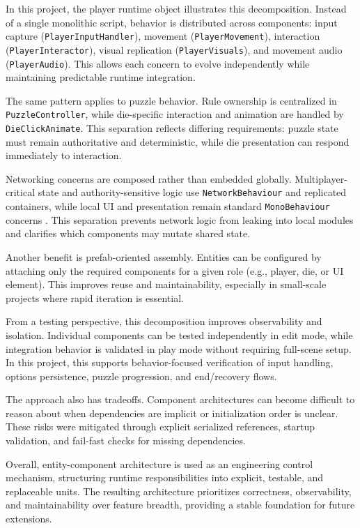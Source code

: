 In this project, the player runtime object illustrates this decomposition. Instead of a single monolithic script, behavior is distributed across components: input capture (\texttt{PlayerInputHandler}), movement (\texttt{PlayerMovement}), interaction (\texttt{PlayerInteractor}), visual replication (\texttt{PlayerVisuals}), and movement audio (\texttt{PlayerAudio}). This allows each concern to evolve independently while maintaining predictable runtime integration.

The same pattern applies to puzzle behavior. Rule ownership is centralized in \texttt{PuzzleController}, while die-specific interaction and animation are handled by \texttt{DieClickAnimate}. This separation reflects differing requirements: puzzle state must remain authoritative and deterministic, while die presentation can respond immediately to interaction.

Networking concerns are composed rather than embedded globally. Multiplayer-critical state and authority-sensitive logic use \texttt{NetworkBehaviour} and replicated containers, while local UI and presentation remain standard \texttt{MonoBehaviour} concerns \cite{unity_monobehaviour_docs}. This separation prevents network logic from leaking into local modules and clarifies which components may mutate shared state.

Another benefit is prefab-oriented assembly. Entities can be configured by attaching only the required components for a given role (e.g., player, die, or UI element). This improves reuse and maintainability, especially in small-scale projects where rapid iteration is essential.

From a testing perspective, this decomposition improves observability and isolation. Individual components can be tested independently in edit mode, while integration behavior is validated in play mode without requiring full-scene setup. In this project, this supports behavior-focused verification of input handling, options persistence, puzzle progression, and end/recovery flows.

The approach also has tradeoffs. Component architectures can become difficult to reason about when dependencies are implicit or initialization order is unclear. These risks were mitigated through explicit serialized references, startup validation, and fail-fast checks for missing dependencies.

Overall, entity-component architecture is used as an engineering control mechanism, structuring runtime responsibilities into explicit, testable, and replaceable units. The resulting architecture prioritizes correctness, observability, and maintainability over feature breadth, providing a stable foundation for future extensions.

